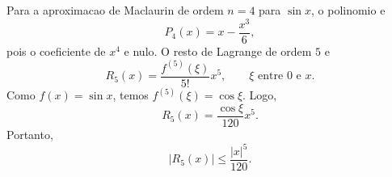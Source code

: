 Para a aproximacao de Maclaurin de ordem $n=4$ para $\sin x$, o polinomio e
\[
P_4(x)=x-\frac{x^3}{6},
\]
pois o coeficiente de $x^4$ e nulo. O resto de Lagrange de ordem $5$ e
\[
R_5(x)=\frac{f^{(5)}(\xi)}{5!}x^5,
\qquad \xi \text{ entre } 0 \text{ e } x.
\]
Como $f(x)=\sin x$, temos $f^{(5)}(\xi)=\cos\xi$. Logo,
\[
R_5(x)=\frac{\cos\xi}{120}x^5.
\]
Portanto,
\[
|R_5(x)| \le \frac{|x|^5}{120}.
\]


